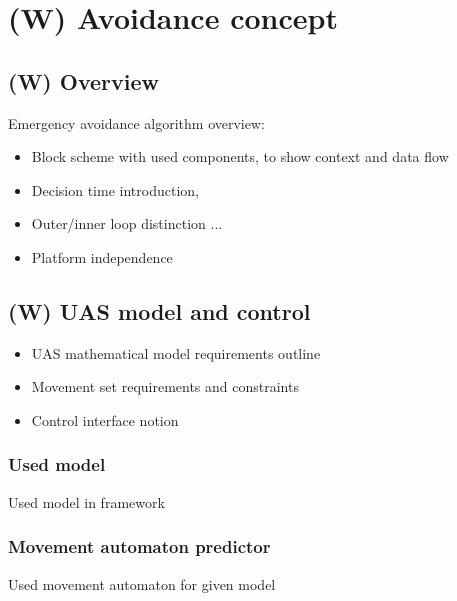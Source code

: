 \section{(W) Avoidance concept}\label{s:avoidanceConcept}
    
\subsection{(W) Overview}\label{s:avoidanceAlgorithmOverView}
    \noindent Emergency avoidance algorithm overview:
    \begin{itemize}
        \item Block scheme with used components, to show context and data flow
        \item Decision time introduction, 
        \item Outer/inner loop distinction ...
        \item Platform independence
    \end{itemize}

\subsection{(W) UAS model and control}\label{s:uasModelAndControl}
    \begin{itemize}
        \item UAS mathematical model requirements outline
        \item Movement set requirements and constraints
        \item Control interface notion
    \end{itemize}
    
    \subsubsection{Used model}
    \noindent Used model in framework
    
    \subsubsection{Movement automaton predictor}
    \noindent Used movement automaton for given model 


